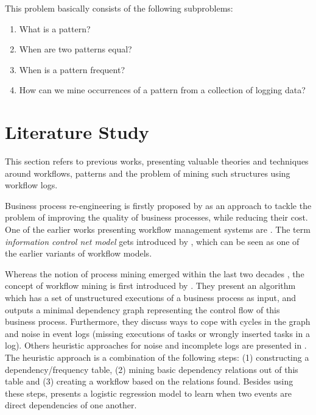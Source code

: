\documentclass[a4paper,11pt]{article}
\begin{document}
This problem basically consists of the following subproblems:
\begin{enumerate}
\item What is a pattern?
\item When are two patterns equal?
\item When is a pattern frequent?
\item How can we mine occurrences of a pattern from a collection of logging data?
\end{enumerate}

\section{Literature Study}
This section refers to previous works, presenting valuable theories and techniques around workflows, patterns and the problem of mining such structures using workflow logs.

Business process re-engineering is firstly proposed by \cite{Hammer1990} as an approach to tackle the problem of improving the quality of business processes, while reducing their cost. One of the earlier works presenting workflow management systems are \cite{EngelGLT79, Ellis1982}. The term \textit{information control net model} gets introduced by \cite{Ellis1982}, which can be seen as one of the earlier variants of workflow models. 

Whereas the notion of process mining emerged within the last two decades \cite{VanderAalst2003}, the concept of workflow mining is first introduced by \cite{Agrawal1998}. They present an algorithm which has a set of unstructured executions of a business process as input, and outputs a minimal dependency graph representing the control flow of this business process. Furthermore, they discuss ways to cope with cycles in the graph and noise in event logs (missing executions of tasks or wrongly inserted tasks in a log). Others heuristic approaches for noise and incomplete logs are presented in \cite{Maruster2002, Weijters2001, Weijters}. The heuristic approach \cite{Weijters2001, Weijters} is a combination of the following steps: (1) constructing a dependency/frequency table, (2) mining basic dependency relations out of this table and (3) creating a workflow based on the relations found. Besides using these steps, \cite{Maruster2002} presents a logistic regression model to learn when two events are direct dependencies of one another. 
\end{document}

